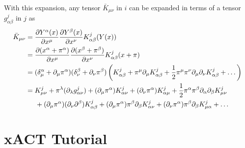 \documentclass{book}
\theoremstyle{definition}
\newcommand{\p}{\partial}
\newcommand{\nn}{\nonumber}
\newcommand{\f}[2]{\frac{#1}{#2}}
\newcommand{\lp}{\left(}
\newcommand{\rp}{\right)}
\begin{document}
With this expansion, any tensor $\bar{K}_{\mu\nu}$ in $i$ can be expanded in terms of a tensor $g^j_{\alpha \beta}$ in $j$ as
\begin{align}
\bar{K}_{\mu\nu} &= \f{\p Y^\alpha (x)}{\p x^\mu}\f{\p Y^\beta (x)}{\p x^\nu} K^j_{\alpha\beta}(Y(x)) \nn\\
&= \f{\p (x^\alpha + \pi^\alpha)}{\p x^\mu}\f{\p (x^\beta + \pi^\beta)}{\p x^\nu} K^j_{\alpha\beta}(x + \pi) \nn\\
&= (\delta^\alpha_\mu + \p_\mu\pi^\alpha)(\delta^\beta_\nu + \p_\nu \pi^\beta)\lp K^j_{\alpha\beta} + \pi^\mu \p_\mu K^j_{\alpha\beta} + \f{1}{2}\pi^\mu \pi^\nu \p_\mu \p_\nu K^j_{\alpha\beta} + \dots \rp\nn\\
&= K^j_{\mu\nu} + \pi^\lambda (\p_\lambda g^j_{\alpha\nu}) + (\p_\mu\pi^\alpha)K^j_{\alpha\nu} + (\p_\nu \pi^\alpha)K^j_{\alpha\mu} + \f{1}{2}\pi^\alpha\pi^\beta \p_\alpha\p_\beta K^j_{\mu\nu} \nn\\
&\hspace{0.5cm} + (\p_\mu \pi^\alpha)(\p_\nu \p^\beta)K^j_{\alpha\beta} + (\p_\mu \pi^\alpha)\pi^\beta \p_\beta K^j_{\alpha\nu} + (\p_\nu \pi^\alpha)\pi^\beta \p_\beta K^j_{\mu\alpha} + \dots
\end{align}

        





























   



















\newpage


\section{xACT Tutorial}
\end{document}
